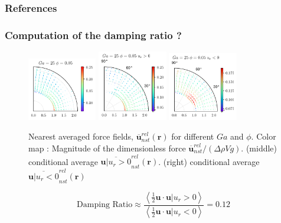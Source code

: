\documentclass{sintefbeamer}
\newcommand{\avg}[1]{\left<#1\right>}
\newcommand{\nstrelavg}[1]{\overline{#1}_{nst}^{rel}}
\begin{document}
\begin{frame}[t]
  \frametitle{References}
  
\end{frame}

 
\backmatter
\begin{frame}
  \frametitle{Computation of the damping ratio ? }
  \begin{figure}
    \centering
    \includegraphics[width=0.27\textwidth]{image/HOMOGENEOUS/fDrop/U_mu_r_0_1_Ga_25_PHI_0_05.pdf}
    \includegraphics[width=0.27\textwidth]{image/HOMOGENEOUS/fDrop/Upos_mu_r_0_1_Ga_25_PHI_0_05.pdf}
    \includegraphics[width=0.27\textwidth]{image/HOMOGENEOUS/fDrop/Uneg_mu_r_0_1_Ga_25_PHI_0_05.pdf}
    \caption{Nearest averaged force fields, $\nstrelavg{\textbf{u}}(\textbf{r})$ for different $Ga$ and $\phi$. 
    Color map : Magnitude of the dimensionless force  $\nstrelavg{\textbf{u}} / (\Delta \rho V g)$.
    (middle) conditional average  $\nstrelavg{\textbf{u}| u_r > 0}(\textbf{r})$. 
    (right) conditional average  $\nstrelavg{\textbf{u}| u_r < 0}(\textbf{r})$ }
  \end{figure}
  \begin{equation}
    \text{Damping Ratio}
    \approx \frac{\avg{\frac{1}{2} \textbf{u} \cdot \textbf{u}| u_r > 0}}
    {\avg{\frac{1}{2}\textbf{u}\cdot \textbf{u}| u_r < 0}}
    = 0.12
  \end{equation}
\end{frame}
\end{document}
